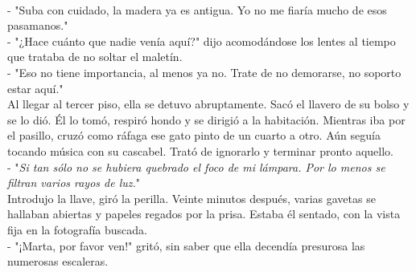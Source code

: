 \\[0.1cm]

- "Suba con cuidado, la madera ya es antigua. Yo no me fiaría mucho de esos pasamanos."\\
- "¿Hace cuánto que nadie venía aquí?" dijo acomodándose los lentes al tiempo que trataba de no soltar el maletín.\\
- "Eso no tiene importancia, al menos ya no. Trate de no demorarse, no soporto estar aquí."\\
Al llegar al tercer piso, ella se detuvo abruptamente. Sacó el llavero de su bolso y se lo dió. Él lo tomó, respiró hondo y se dirigió a la habitación. Mientras iba por el pasillo, cruzó como ráfaga ese gato pinto de un cuarto a otro. Aún seguía tocando música con su cascabel. Trató de ignorarlo y terminar pronto aquello.\\
- "{\it Si tan sólo no se hubiera quebrado el foco de mi lámpara. Por lo menos se filtran varios rayos de luz.}"\\
Introdujo la llave, giró la perilla. Veinte minutos después, varias gavetas se hallaban abiertas y papeles regados por la prisa. Estaba él sentado, con la vista fija en la fotografía buscada.\\
- "¡Marta, por favor ven!" gritó, sin saber que ella decendía presurosa las numerosas escaleras.\\[0.5cm]